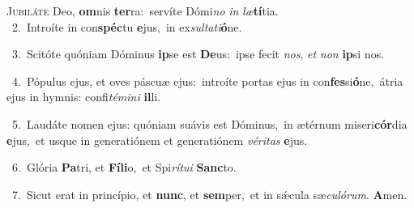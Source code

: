 \lettrine{\initial\textcolor{\initialcolor}{J}}{ubiláte} Deo, \textbf{om}\-nis \textbf{ter}\-ra:~\star servíte Dómi\textit{no} \textit{in} \textit{læ}\-\textbf{tí}tia.\\
{\numbfont\textcolor{\numbcolor}{~2.}}~Introíte in con\-\textbf{spéc}\-tu \textbf{e}\-jus,~\star in ex\-\textit{sul}\-\textit{ta}\textit{ti}\textbf{ó}ne.\par
{\numbfont\textcolor{\numbcolor}{~3.}}~Scitóte quóniam Dóminus \textbf{ip}\-se est \textbf{De}\-us:~\star ipse fecit \textit{nos}\-, \textit{et} \textit{non} \textbf{ip}\-si nos.\par
{\numbfont\textcolor{\numbcolor}{~4.}}~Pópulus ejus, et oves páscuæ ejus:~\dagger introíte portas ejus in con\-\textbf{fes}\-si\-\textbf{ó}\-ne,~\star átria ejus in hymnis: confi\-\textit{té}\-\textit{mi}\textit{ni} \textbf{il}\-li.\par
{\numbfont\textcolor{\numbcolor}{~5.}}~Laudáte nomen ejus: quóniam suávis est Dóminus,~\dagger in ætérnum miseri\-\textbf{cór}\-dia \textbf{e}\-jus,~\star et usque in generatiónem et generatiónem \textit{vé}\-\textit{ri}\textit{tas} \textbf{e}\-jus.\par
{\numbfont\textcolor{\numbcolor}{~6.}}~Glória \textbf{Pa}\-tri, et \textbf{Fí}\-\textbf{li}o,~\star et Spi\-\textit{rí}\-\textit{tu}\textit{i} \textbf{Sanc}\-to.\par
{\numbfont\textcolor{\numbcolor}{~7.}}~Sicut erat in princípio, et \textbf{nunc}\-, et \textbf{sem}\-per,~\star et in sǽcula sæ\-\textit{cu}\-\textit{ló}\textit{rum}. \textbf{A}\-men.\par
